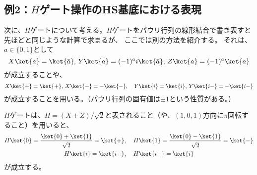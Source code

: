 \documentclass[a4paper,11pt,uplatex]{jsarticle}%
\begin{document}
\subsection*{例2：$H$ゲート操作のHS基底における表現}
次に、$H$ゲートについて考える。$H$ゲートをパウリ行列の線形結合で書き表すと先ほどと同じような計算で求まるが、
ここでは別の方法を紹介する。
それは、$a\in\{0,1\}$として
\begin{equation}
  X\ket{a} = \ket{\bar{a}},\,Y\ket{a} = (-1)^ai\ket{\bar{a}},\,Z\ket{a} = (-1)^a\ket{a}
\end{equation}
が成立することや、
\begin{equation}
  X\ket{+} = \ket{+},\,X\ket{-}=-\ket{-},\quad Y\ket{i} = \ket{i},\,Y\ket{i-}=-\ket{i-}
\end{equation}
が成立することを用いる。（パウリ行列の固有値は$\pm 1$という性質がある。）

$H$ゲートは、$H=(X+Z)/\sqrt{2}$と表されること（や、$(1,0,1)$方向に$\pi$回転すること）を用いると、
\begin{gather}
  H\ket{0} = \frac{\ket{0}+\ket{1}}{\sqrt{2}} = \ket{+},\quad H\ket{1} = \frac{\ket{0}-\ket{1}}{\sqrt{2}} = \ket{-} \\
  H\ket{i} = \ket{i-},\quad H\ket{i-} = \ket{i}
\end{gather}
が成立する。
\end{document}

